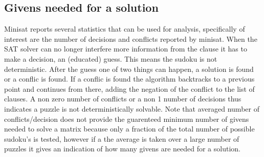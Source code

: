 \subsection{Givens needed for a solution}
Minisat reports several statistics that can be used for analysis, specifically of interest are the number of decisions and conflicts reported by minisat. When the SAT solver can no longer interfere more information from the clause it has to make a decision, an (educated) guess. This means the sudoku is not deterministic. After the guess one of two things can happen, a solution is found or a conflic is found. If a conflic is found the algorithm backtracks to a previous point and continues from there, adding the negation of the conflict to the list of clauses.
A non zero number of conflicts or a non 1 number of decisions thus indicates a puzzle is not deterministically solvable. Note that averaged number of conflicts/decision does not provide the guarenteed minimum number of givens needed to solve a matrix because only a fraction of the total number of possible sudoku's is tested, however if a the average is taken over a large number of puzzles it gives an indication of how many givens are needed for a solution.





